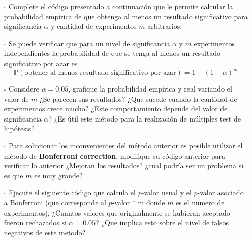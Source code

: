 \documentclass[]{article}
\newenvironment{Shaded}{\begin{snugshade}}{\end{snugshade}}
\newcommand{\AttributeTok}[1]{\textcolor[rgb]{0.77,0.63,0.00}{#1}}
\newcommand{\FunctionTok}[1]{\textcolor[rgb]{0.00,0.00,0.00}{#1}}
\newcommand{\NormalTok}[1]{#1}
\newcommand{\OtherTok}[1]{\textcolor[rgb]{0.56,0.35,0.01}{#1}}
\newcommand{\SpecialCharTok}[1]{\textcolor[rgb]{0.00,0.00,0.00}{#1}}
\newcommand{\StringTok}[1]{\textcolor[rgb]{0.31,0.60,0.02}{#1}}
\providecommand{\tightlist}{%
  \setlength{\itemsep}{0pt}\setlength{\parskip}{0pt}}
\begin{document}
\begin{itemize}
\tightlist
\item[$\square$]
  Complete el código presentado a continuación que le permite calcular
  la probabilidad empírica de que obtenga al menos un resultado
  significativo para significancia \(\alpha\) y cantidad de experimentos
  \(m\) arbitrarios.
\item[$\square$]
  Se puede verificar que para un nivel de significancia \(\alpha\) y
  \(m\) experimentos independientes la probabilidad de que se tenga al
  menos un resultado significativo por azar es
  \[\mathbb{P}(\text{obtener al menos resultado significativo por azar})=1-(1-\alpha)^{m}\]
\item[$\square$]
  Considere \(\alpha = 0.05\), grafique la probabilidad empírica y real
  variando el valor de \(m\) ¿Se parecen sus resultados? ¿Que sucede
  cuando la cantidad de experimentos crece mucho? ¿Este comportamiento
  depende del valor de significancia \(\alpha\)? ¿Es útil este método
  para la realización de múltiples test de hipótesis?
\item[$\square$]
  Para solucionar los inconvenientes del método anterior es posible
  utilizar el método de \textbf{Bonferroni correction}, modifique su
  código anterior para verificar lo anterior ¿Mejoran los resultados?
  ¿cual podría ser un problema si es que \(m\) es muy grande?
\item[$\square$]
  Ejecute el siguiente código que calcula el \(p\)-valor usual y el
  \(p\)-valor asociado a Bonferroni (que corresponde al \(p\)-valor * m
  donde \(m\) es el numero de experimentos), ¿Cuantos valores que
  originalmente se hubieran aceptado fueron rechazados si
  \(\alpha = 0.05\)? ¿Que implica esto sobre el nivel de falsos
  negativos de este metodo?
\end{itemize}

\begin{Shaded}
\end{Shaded}
\end{document}
